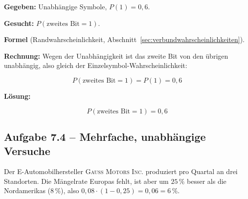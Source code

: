 \begin{beispiel}

\textbf{Gegeben:} Unabhängige Symbole, $P(1)=0{,}6$.

\textbf{Gesucht:} $P(\text{zweites Bit}=1)$.

\textbf{Formel} (Randwahrscheinlichkeit, Abschnitt~\ref{sec:verbundwahrscheinlichkeiten}).

\textbf{Rechnung:} Wegen der Unabhängigkeit ist das zweite Bit von den übrigen
unabhängig, also gleich der Einzelsymbol-Wahrscheinlichkeit:

$$
P(\text{zweites Bit}=1) = P(1) = 0{,}6
$$

\textbf{Lösung:}

$$
\boxed{P(\text{zweites Bit}=1) = 0{,}6}
$$

\end{beispiel}

\subsection*{Aufgabe 7.4 – Mehrfache, unabhängige Versuche}

Der E-Automobilhersteller \textsc{Gauss Motors Inc.} produziert pro Quartal an drei
Standorten. Die Mängelrate Europas fehlt, ist aber um $25\,\%$ besser als die
Nordamerikas ($8\,\%$), also $0{,}08\cdot(1-0{,}25) = 0{,}06 = 6\,\%$.

